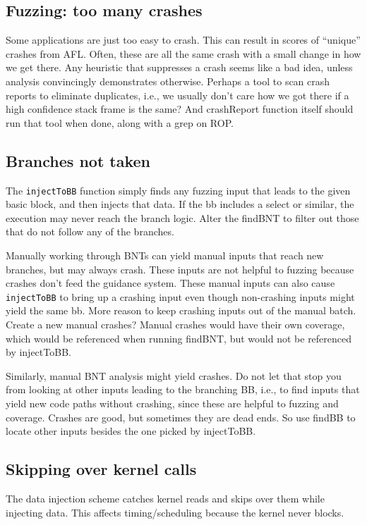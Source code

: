 \documentclass[titlepage]{article}
\begin{document}
\begin{appendices}
\subsection{Fuzzing: too many crashes}
Some applications are just too easy to crash.  This can result in scores of ``unique'' crashes from AFL.  Often, these are all the same
crash with a small change in how we get there.  Any heuristic that suppresses a crash seems like a bad idea, unless analysis convincingly demonstrates otherwise.
Perhaps a tool to scan crash reports to eliminate duplicates, i.e., we usually don't care how we got there if a high confidence stack frame is the same?
And crashReport function itself should run that tool when done, along with a grep on ROP.

\subsection{Branches not taken}
The {\tt injectToBB} function simply finds any fuzzing input that leads to the given basic block, and then injects that data.
If the bb includes a select or similar, the execution may never reach the branch logic.  Alter the findBNT to filter out those that do not
follow any of the branches.

Manually working through BNTs can yield manual inputs that reach new branches, but may always crash.  These inputs are not helpful to fuzzing because crashes don't 
feed the guidance system.  These manual inputs can also cause {\tt injectToBB} to bring up a crashing input even though non-crashing inputs might yield the same bb.
More reason to keep crashing inputs out of the manual batch.  Create a new manual crashes?  Manual crashes would have their own coverage, which would be referenced
when running findBNT, but would not be referenced by injectToBB.

Similarly, manual BNT analysis might yield crashes.  Do not let that stop you from looking at other inputs leading to the branching BB, i.e., to find inputs that
yield new code paths without crashing, since these are helpful to fuzzing and coverage.  Crashes are good, but sometimes they are dead ends.  So use findBB to locate other
inputs besides the one picked by injectToBB.


\subsection{Skipping over kernel calls}
The data injection scheme catches kernel reads and skips over them while injecting data.  This affects timing/scheduling because the kernel never
blocks.


\end{appendices}
\end{document}

